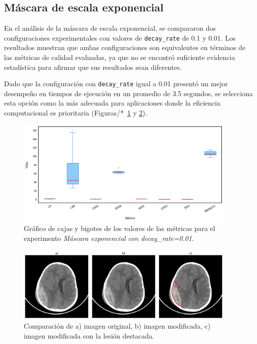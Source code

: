 \subsection{Máscara de escala exponencial}

En el análisis de la máscara de escala exponencial, se compararon dos configuraciones experimentales con valores de \texttt{decay\_rate} de 0.1 y 0.01. Los resultados muestran que ambas configuraciones son equivalentes en términos de las métricas de calidad evaluadas, ya que no se encontró suficiente evidencia estadística para afirmar que sus resultados sean diferentes.

Dado que la configuración con \texttt{decay\_rate} igual a 0.01 presentó un mejor desempeño en tiempos de ejecución en un promedio de 3.5 segundos, se selecciona esta opción como la más adecuada para aplicaciones donde la eficiencia computacional es prioritaria (Figuras/*~\ref{fig:boxplot-exponential} y \ref{fig:comparison-exponential}).

\begin{figure}[H]
    \centering
    \includegraphics[width=0.95\textwidth]{Graphics/boxplot-exponential-mask.png}
    \caption{Gráfico de cajas y bigotes de los valores de las métricas para el experimento \textit{Máscara exponencial con decay\_rate=0.01}.}
    \label{fig:boxplot-exponential}
\end{figure}

\begin{figure}[H]
    \centering
    \includegraphics[width=0.95\textwidth]{Graphics/comparison-exponential.png}
    \caption{Comparación de a) imagen original, b) imagen modificada, c) imagen modificada con la lesión destacada.}
    \label{fig:comparison-exponential}
\end{figure}

